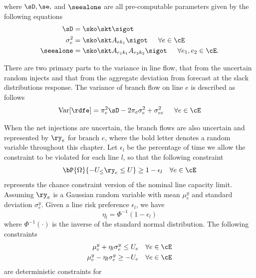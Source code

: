 where  $\sD, \se,$ and $\seealone$ are all pre-computable parameters given by the following equations
\begin{subequations}
\begin{align}
 \sD &= \sko \skt \sigot  \\
 \sigma^2_e &= \sko \skt A_{ek_1} \sigot   \hspace{15px} \forall e \in \cE\\
 \seealone &= \sko \skt A_{e_1 k_1} A_{e_2 k_2} \sigot \hspace{15px} \forall e_1,e_2 \in \cE.
\end{align}
\end{subequations}



There are two primary parts to the variance in line flow, that from the uncertain random injects and that from the aggregate deviation from forecast at the slack distributions response.  The variance of branch flow on line $e$ is described as follows  
\begin{equation}
\operatorname{Var}[ \rdfe ] =  \pi_e^2  \sD  - 2 \pi_e \sigma^2_e  + \sigma^2_{e e}  \hspace{15px} \forall e \in \cE
\end{equation}



When the net injections are uncertain, the branch flows are also uncertain and represented by $\ry_e$ for branch $e$, where the bold letter denotes a random variable throughout this chapter.  Let $\epsilon_l$ be the percentage of time we allow the constraint to be violated for each line $l$, so that the following constraint 
\begin{equation}\label{eq_cc}
 \bP{\Omega}{  -U_ \leq  \ry_e \leq U } \geq 1- \epsilon_l \hspace{10px} \forall e \in \cE
\end{equation}
represents the chance constraint version of the nominal line capacity limit.  Assuming $\ry_e$ is a Gaussian random variable with mean $\mu^y_e$ and standard deviation $\sigma^y_e$. Given a line risk preference $\epsilon_l$, we have 
\begin{equation}\label{etaequation}
\eta_l = \Phi^{-1}\left(1-\epsilon_l\right)
\end{equation}
 where $\Phi^{-1} ( \cdot )$ is the inverse of the standard normal distribution. The following constraints
\begin{align*}
 \mu^y_e + \eta_l \sigma^y_e \leq U_e  \hspace{10px} \forall e \in \cE \\
 \mu^y_e - \eta_l \sigma^y_e \geq -U_e  \hspace{10px} \forall e \in \cE
\end{align*}
are deterministic constraints for 

